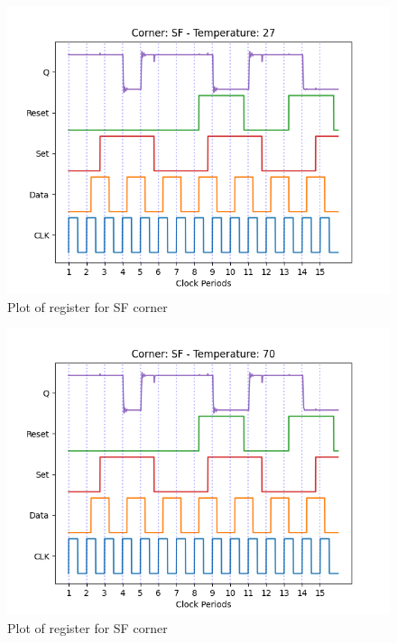 \begin{figure}[H]
    \centering
    \includegraphics[width=\textwidth]{Figures/Aimspice_Plots/SF_27.png}
    \caption{Plot of register for SF corner}
    \label{fig:SF27}
\end{figure}

\begin{figure}[H]
    \centering
    \includegraphics[width=\textwidth]{Figures/Aimspice_Plots/SF_70.png}
    \caption{Plot of register for SF corner}
    \label{fig:SF70}
\end{figure}

